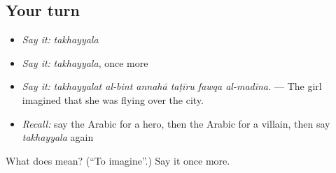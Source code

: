 \subsection*{Your turn}
\begin{itemize}
\raggedright
  \item \emph{Say it:} \emph{takhayyala}
  \item \emph{Say it:} \emph{takhayyala}, once more
  \item \emph{Say it:} \emph{takhayyalat al-bint annahā taṭīru fawqa al-madīna.} — The girl imagined that she was flying over the city.
  \item \emph{Recall:} say the Arabic for a hero, then the Arabic for a villain, then say \emph{takhayyala} again
\end{itemize}

\begin{tcolorbox}[breakable,colback=teal!4,colframe=teal!35!black,title={Before you move on}]
What does  mean? (\textquotedblleft{}To imagine\textquotedblright{}.) Say it once more.
\end{tcolorbox}

